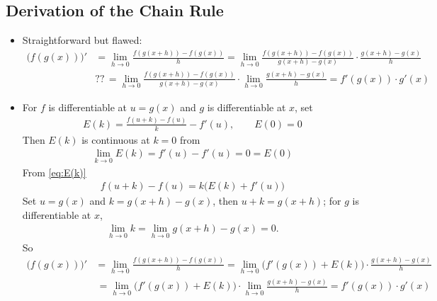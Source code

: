 \subsection*{Derivation of the Chain Rule}
\begin{itemize}
  \item Straightforward but flawed:
    \begin{align*}
      \big(f(g(x))\big)' &= \lim_{h\to 0}\frac{f(g(x + h)) - f(g(x))}{h} = \lim_{h\to 0}\frac{f(g(x+h)) - f(g(x))}{g(x + h) - g(x)}\cdot\frac{g(x + h) - g(x)}{h} \\
      & ??\,=\lim_{h\to 0}\frac{f(g(x+h)) - f(g(x))}{g(x + h) - g(x)}\cdot\lim_{h\to 0}\frac{g(x + h) - g(x)}{h} = f'(g(x))\cdot g'(x)
    \end{align*}
  \item For $f$ is differentiable at $u = g(x)$ and $g$ is differentiable at $x$, set
    \begin{align}\label{eq:E(k)}
      E(k) = \frac{f(u + k) - f(u)}{k} - f'(u), \qquad E(0) = 0
    \end{align}
    Then $E(k)$ is continuous at $k = 0$ from
    \begin{align*}
      \lim_{k\to 0}E(k) = f'(u) - f'(u) = 0 = E(0)
    \end{align*}
    From \eqref{eq:E(k)}
    \begin{align*}
      f(u + k) - f(u) = k\big(E(k) + f'(u)\big)
    \end{align*}
    Set $u = g(x)$ and $k = g(x + h) - g(x)$, then $u + k = g(x + h)$; for $g$ is differentiable at $x$,
    \begin{align*}
      \lim_{h\to 0}k = \lim_{h\to 0} g(x + h) - g(x) = 0.
    \end{align*}
    So
    \begin{align*}
      \big(f(g(x))\big)' &= \lim_{h\to 0}\frac{f(g(x + h)) - f(g(x))}{h} = \lim_{h\to 0}\big(f'(g(x)) + E(k)\big)\cdot\frac{g(x + h) - g(x)}{h} \\
      &\,=\lim_{h\to 0}\big(f'(g(x)) + E(k)\big)\cdot\lim_{h\to 0}\frac{g(x + h) - g(x)}{h} = f'(g(x))\cdot g'(x)
    \end{align*}
\end{itemize}

